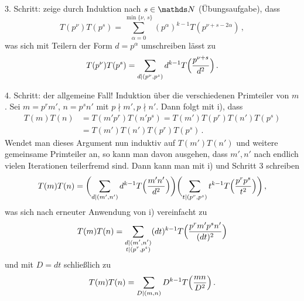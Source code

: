 \begin{bewe}
	3. Schritt: zeige durch Induktion nach $s \in \NN$ (Übungsaufgabe), dass 
	\[
	T(p^\nu) T(p^s) = \sum_{\alpha = 0}^{\min \{\nu,\,s\}} (p^\alpha)^{k-1} T(p^{\nu + s - 2\alpha})
	\,,
	\]
	was sich mit Teilern der Form $d = p^\alpha$ umschreiben lässt zu
	\[
	T(p^\nu) T(p^s) = \sum_{d \vert (p^\nu, p^s)} d^{k-1} T\Bigl(\frac{p^{\nu + s}}{d^2}\Bigr)
	\,.
	\]
	
	4. Schritt: der allgemeine Fall! Induktion über die verschiedenen Primteiler von $m$. Sei $m = p^r m'$, $n = p^s n'$ mit $p \nmid m', p \nmid n'$. Dann folgt mit i), dass
	\begin{align*}
	T(m)T(n)
	&= T(m'p^r) T(n'p^s)
	= T(m')T(p^r)T(n')T(p^s) \\
	&= T(m')T(n') T(p^r) T(p^s)
	\,.
	\end{align*}
	Wendet man dieses Argument nun induktiv auf $T(m')T(n')$ und weitere gemeinsame Primteiler an, so kann man davon ausgehen, dass $m', n'$ nach endlich vielen Iterationen teilerfremd sind. Dann kann man mit i) und Schritt 3 schreiben
	\[
	T(m)T(n) = \biggl(\sum_{d \vert (m',n')} d^{k-1} T\Bigl(\frac {m'n'}{d^2}\Bigr)\biggr) \biggl(\sum_{t \vert (p^r, p^s)} t^{k-1} T\Bigl(\frac{p^rp^s}{t^2}\Bigr) \biggr)
	\,,
	\]
	was sich nach erneuter Anwendung von i) vereinfacht zu
	\[
	T(m)T(n) = \sum_{\substack{d \vert (m',n')\\t \vert (p^r, p^s)}} (dt)^{k-1} T\Bigl(\frac {p^rm'p^sn'}{(dt)^2}\Bigr)
	\]
	und mit $D = dt$ schließlich zu
	\[
	T(m)T(n) = \sum_{D \vert (m,n)} D^{k-1} T\Bigl(\frac {mn}{D^2}\Bigr)
	\,.
	\]
\end{bewe}

